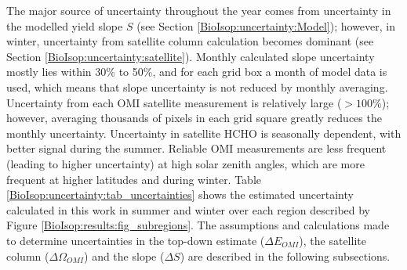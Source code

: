 \documentclass[acp, manuscript]{copernicus}
\newcommand{\Oomi}{\Omega_{OMI}} %
\newcommand{\apost}{E_{OMI}} %
\begin{document}
  The major source of uncertainty throughout the year comes from uncertainty in the modelled yield slope $S$ (see Section \ref{BioIsop:uncertainty:Model}); however, in winter, uncertainty from satellite column calculation becomes dominant (see Section \ref{BioIsop:uncertainty:satellite}).
  Monthly calculated slope uncertainty mostly lies within 30\% to 50\%, and for each grid box a month of model data is used, which means that slope uncertainty is not reduced by monthly averaging.
  Uncertainty from each OMI satellite measurement is relatively large ($>100\%$); however, averaging thousands of pixels in each grid square greatly reduces the monthly uncertainty.
  Uncertainty in satellite HCHO is seasonally dependent, with better signal during the summer.
  Reliable OMI measurements are less frequent (leading to higher uncertainty) at high solar zenith angles, which are more frequent at higher latitudes and during winter.
  Table \ref{BioIsop:uncertainty:tab_uncertainties} shows the estimated uncertainty calculated in this work in summer and winter over each region described by Figure \ref{BioIsop:results:fig_subregions}.
  The assumptions and calculations made to determine uncertainties in the top-down estimate ($\Delta \apost$), the satellite column ($\Delta \Oomi$) and the slope ($\Delta S$) are described in the following subsections.
  
\end{document}
